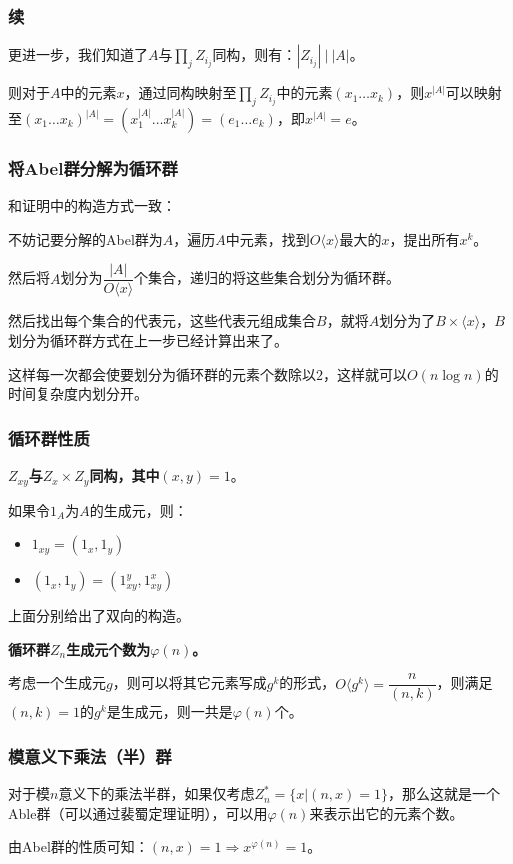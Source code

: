 \documentclass[10pt]{beamer}
\begin{document}
	\begin{frame}
		\frametitle{续}
	
		更进一步，我们知道了$A$与$\prod_j Z_{i_j}$同构，则有：$|Z_{i_j}|~{\big|}~|A|$。

		则对于$A$中的元素$x$，通过同构映射至$\prod_j Z_{i_j}$中的元素$(x_1\dots x_k)$，则$x^{|A|}$可以映射至$(x_1\dots x_k)^{|A|}=(x_1^{|A|}\dots x_k^{|A|})=(e_1\dots e_k)$，即$x^{|A|}=e$。
	
	\end{frame}
	\begin{frame}
		\frametitle{将Abel群分解为循环群}
	
		和证明中的构造方式一致：

		不妨记要分解的Abel群为$A$，遍历$A$中元素，找到$O\langle x\rangle$最大的$x$，提出所有$x^k$。

		然后将$A$划分为$\dfrac{|A|}{O\langle x\rangle}$个集合，递归的将这些集合划分为循环群。

		然后找出每个集合的代表元，这些代表元组成集合$B$，就将$A$划分为了$B\times \langle x\rangle$，$B$划分为循环群方式在上一步已经计算出来了。

		这样每一次都会使要划分为循环群的元素个数除以$2$，这样就可以$O(n\log n)$的时间复杂度内划分开。
	
	\end{frame}
	\begin{frame}
		\frametitle{循环群性质}
	
		\textbf{$Z_{xy}$与$Z_x\times Z_y$同构，其中$(x,y)=1$}。
		
		如果令$1_A$为$A$的生成元，则：

		\begin{itemize}
			\item $1_{xy}=(1_x,1_y)$
			\item $(1_x,1_y)=(1_{xy}^y,1_{xy}^x)$
		\end{itemize}

		上面分别给出了双向的构造。

		\textbf{循环群$Z_n$生成元个数为$\varphi(n)$。}

		考虑一个生成元$g$，则可以将其它元素写成$g^k$的形式，$O\langle g^k\rangle=\dfrac{n}{(n,k)}$，则满足$(n,k)=1$的$g^k$是生成元，则一共是$\varphi(n)$个。
	
	\end{frame}
	\begin{frame}
		\frametitle{模意义下乘法（半）群}
	
		对于模$n$意义下的乘法半群，如果仅考虑$Z_n^*=\{x|(n,x)=1\}$，那么这就是一个Able群（可以通过裴蜀定理证明），可以用$\varphi(n)$来表示出它的元素个数。

		由Abel群的性质可知：$(n,x)=1\Rightarrow x^{\varphi(n)}=1$。
	
	\end{frame}
\end{document}
